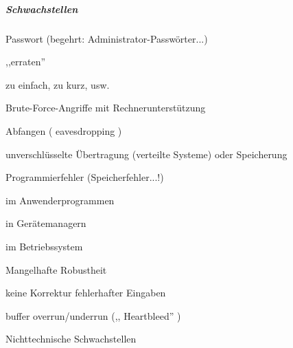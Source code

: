 \documentclass[a4paper]{article}
\begin{document}
\begin{multicols}{3}
    \subparagraph{Schwachstellen}

    \begin{enumerate*}
        \item
        Passwort (begehrt: Administrator-Passwörter...)
    \end{enumerate*}

    \begin{itemize*}
        \item
        ,,erraten''
        \item
        zu einfach, zu kurz, usw.
        \item
        Brute-Force-Angriffe mit Rechnerunterstützung
        \item
        Abfangen ( eavesdropping )
        \item
        unverschlüsselte Übertragung (verteilte Systeme) oder Speicherung
    \end{itemize*}

    \begin{enumerate*}
        \setcounter{enumi}{1}
        \item
        Programmierfehler (Speicherfehler...!)
    \end{enumerate*}

    \begin{itemize*}
        \item
        im Anwenderprogrammen
        \item
        in Gerätemanagern
        \item
        im Betriebssystem
    \end{itemize*}

    \begin{enumerate*}
        \setcounter{enumi}{2}
        \item
        Mangelhafte Robustheit
    \end{enumerate*}

    \begin{itemize*}
        \item
        keine Korrektur fehlerhafter Eingaben
        \item
        buffer overrun/underrun (,, Heartbleed'' )
    \end{itemize*}

    \begin{enumerate*}
        \setcounter{enumi}{3}
        \item
        Nichttechnische Schwachstellen
    \end{enumerate*}


\end{multicols}
\end{document}
